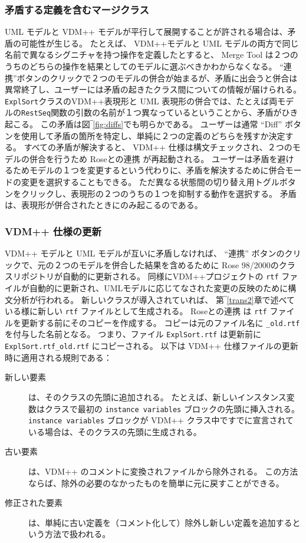 \documentclass[\pformat,12pt]{jarticle}
\newcommand{\vdmpp}{VDM++}
\newcommand{\link}{Roseとの連携}
\newcommand{\rose}{Rose 98/2000}
\begin{document}
\subsubsection*{矛盾する定義を含むマージクラス}
\label{mergingclasses}
 
 UML モデルと \vdmpp{} モデルが平行して展開することが許される場合は、矛盾の可能性が生じる。
たとえば、 \vdmpp{}モデルと UML モデルの両方で同じ名前で異なるシグニチャを持つ操作を定義したとすると、 Merge Tool は２つのうちのどちらの操作を結果としてのモデルに選ぶべきかわからなくなる。
``連携''ボタンのクリックで２つのモデルの併合が始まるが、矛盾に出会うと併合は異常終了し、ユーザーには矛盾の起きたクラス間についての情報が届けられる。
 {\tt ExplSort}クラスの\vdmpp{}表現形と UML 表現形の併合では、たとえば両モデルの{\tt RestSeq}関数の引数の名前が１つ異なっているということから、矛盾がひき起こる。
この矛盾は図‾\ref{fig:diffs}でも明らかである。
ユーザーは通常 ``Diff'' ボタンを使用して矛盾の箇所を特定し、単純に２つの定義のどちらを残すか決定する。
すべての矛盾が解決すると、 \vdmpp{} 仕様は構文チェックされ、２つのモデルの併合を行うため \link{} が再起動される。
ユーザーは矛盾を避けるためモデルの１つを変更するという代わりに、矛盾を解決するために併合モードの変更を選択することもできる。
ただ異なる状態間の切り替え用トグルボタンをクリックし、表現形の２つのうちの１つを抑制する動作を選択する。
矛盾は、表現形が併合されたときにのみ起こるのである。

\subsubsection*{ \vdmpp{} 仕様の更新}
\label{updating}
  
\vdmpp{} モデルと UML モデルが互いに矛盾しなければ、 ``連携'' ボタンのクリックで、元の２つのモデルを併合した結果を含めるために \rose{}のクラスリポジトリが自動的に更新される。
同様に\vdmpp{}プロジェクトの {\tt rtf} ファイルが自動的に更新され、UMLモデルに応じてなされた変更の反映のために構文分析が行われる。
新しいクラスが導入されていれば、 第‾\ref{trans2}章で述べている様に新しい {\tt rtf} ファイルとして生成される。
 \link{} は {\tt rtf} ファイルを更新する前にそのコピーを作成する。
コピーは元のファイル名に {\tt \_old.rtf} を付与した名前となる。
つまり、ファイル {\tt ExplSort.rtf} は更新前に {\tt  ExplSort.rtf\_old.rtf} にコピーされる。
以下は \vdmpp{} 仕様ファイルの更新時に適用される規則である：


\begin{description}
\item[新しい要素] は、そのクラスの先頭に追加される。
たとえば、新しいインスタンス変数はクラスで最初の {\tt instance variables} ブロックの先頭に挿入される。
 {\tt instance variables} ブロックが \vdmpp{} クラス中ですでに宣言されている場合は、そのクラスの先頭に生成される。
\item[古い要素] は、\vdmpp{} のコメントに変換されファイルから除外される。
この方法ならば、除外の必要のなかったものを簡単に元に戻すことができる。
\item[修正された要素] は、単純に古い定義を（コメント化して）除外し新しい定義を追加するという方法で扱われる。
\end{description}
\end{document}
